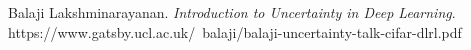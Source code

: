 \documentclass[preview]{standalone}
\begin{document}
Balaji Lakshminarayanan. \textit{Introduction to Uncertainty in Deep Learning}. https://www.gatsby.ucl.ac.uk/~balaji/balaji-uncertainty-talk-cifar-dlrl.pdf\\
\end{document}

